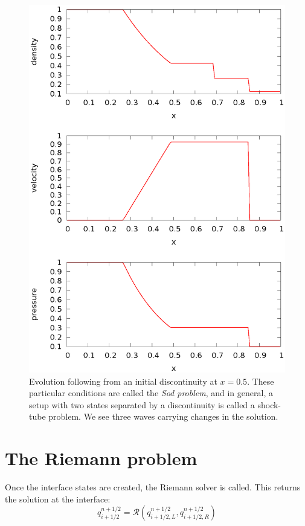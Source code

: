 \begin{figure}
\centering
\includegraphics[width=0.8\linewidth]{sod}
\caption[The Sod problem]{\label{fig:sod} Evolution following from an initial
  discontinuity at $x = 0.5$.  These particular conditions are called
  the {\em Sod problem}, and in general, a setup with two states
  separated by a discontinuity is called a shock-tube problem.  We see three
  waves carrying changes in the solution. }
\end{figure}






\section{The Riemann problem}

Once the interface states are created, the Riemann solver is called.  This
returns the solution at the interface:
\begin{equation}
q_{i+1/2}^{n+1/2} = \mathcal{R}(q_{i+1/2,L}^{n+1/2}, q_{i+1/2,R}^{n+1/2})
\end{equation}

